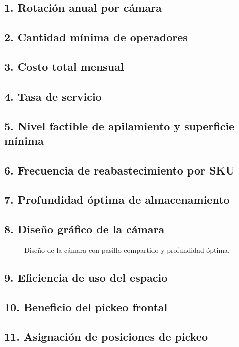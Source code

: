 \subsection*{1. Rotación anual por cámara}

\subsection*{2. Cantidad mínima de operadores}

\subsection*{3. Costo total mensual}

\subsection*{4. Tasa de servicio}

\subsection*{5. Nivel factible de apilamiento y superficie mínima}

\subsection*{6. Frecuencia de reabastecimiento por SKU}

\subsection*{7. Profundidad óptima de almacenamiento}

\subsection*{8. Diseño gráfico de la cámara}

\begin{figure}[H]
    \centering
    \caption{Diseño de la cámara con pasillo compartido y profundidad óptima.}
\end{figure}

\subsection*{9. Eficiencia de uso del espacio}

\subsection*{10. Beneficio del pickeo frontal}

\subsection*{11. Asignación de posiciones de pickeo}
